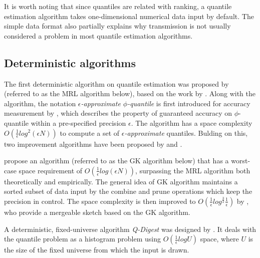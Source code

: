 It is worth noting that since quantiles are related with ranking, a quantile estimation algorithm takes one-dimensional numerical data input by default. The simple data format also partially explains why transmission is not usually considered a problem in most quantile estimation algorithms.
\subsection{Deterministic algorithms}
\label{deterministic}
The first deterministic algorithm on quantile estimation was proposed by \citeauthor{mankuApproximateMediansOthera}\cite{mankuApproximateMediansOthera} (referred to as the MRL algorithm below), based on the work by \citeauthor{munroSelectionSortingLimited1980}\cite{munroSelectionSortingLimited1980}. Along with the algorithm, the notation \textit{$\epsilon$-approximate $\phi$-quantile} is first introduced for accuracy measurement by \citeauthor{mankuApproximateMediansOthera}, which describes the property of guaranteed accuracy on $\phi$-quantile within a pre-specified precision $\epsilon$. The algorithm has a space complexity $O(\frac{1}{\epsilon}log^2 (\epsilon N))$ to compute a set of \textit{$\epsilon$-approximate} quantiles. Bulding on this, two improvement algorithms have been proposed by \citeauthor{greenwaldQuantilesEquidepthHistograms2016a}\cite{greenwaldQuantilesEquidepthHistograms2016a} and \citeauthor{shrivastavaMediansNewAggregation2004}\cite{shrivastavaMediansNewAggregation2004}.

\citeauthor{greenwaldQuantilesEquidepthHistograms2016a}\cite{greenwaldQuantilesEquidepthHistograms2016a} propose an algorithm (referred to as the GK algorithm below) that has a worst-case space requirement of $O(\frac{1}{\epsilon}log(\epsilon N))$, surpassing the MRL algorithm both theoretically and empirically. The general idea of GK algorithm maintains a sorted subset of data input by the combine and prune operations which keep the precision in control. The space complexity is then improved to $O(\frac{1}{\epsilon}log^{\frac{3}{2}}\frac{1}{\epsilon})$ by \citeauthor{agarwalMergeableSummaries}\cite{agarwalMergeableSummaries}, who provide a mergeable sketch based on the GK algorithm.

A deterministic, fixed-universe algorithm \textit{Q-Digest} was designed by \citeauthor{shrivastavaMediansNewAggregation2004}\cite{shrivastavaMediansNewAggregation2004}. It deals with the quantile problem as a histogram problem using $O (\frac{1}{\epsilon}log U)$ space, where $U$ is the size of the fixed universe from which the input is drawn.




